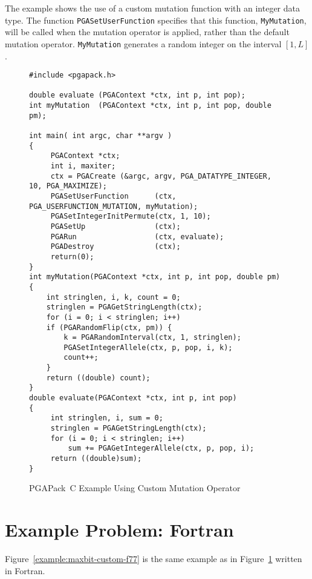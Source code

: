 \documentclass{report}
\newcommand{\pga}{PGAPack}
\begin{document}
The example shows the use of a custom mutation function with an integer data
type.  The function {\tt PGASetUserFunction} specifies that this function,
{\tt MyMutation}, will be called when the mutation operator is applied, rather
than the default mutation operator.  {\tt MyMutation} generates a random
integer on the interval $[1,L]$.

\begin{figure}
\begin{verbatim}
#include <pgapack.h>

double evaluate (PGAContext *ctx, int p, int pop);
int myMutation  (PGAContext *ctx, int p, int pop, double pm);

int main( int argc, char **argv )
{
     PGAContext *ctx; 
     int i, maxiter;
     ctx = PGACreate (&argc, argv, PGA_DATATYPE_INTEGER, 10, PGA_MAXIMIZE);
     PGASetUserFunction      (ctx, PGA_USERFUNCTION_MUTATION, myMutation);
     PGASetIntegerInitPermute(ctx, 1, 10);
     PGASetUp                (ctx);
     PGARun                  (ctx, evaluate);
     PGADestroy              (ctx);
     return(0);
}
int myMutation(PGAContext *ctx, int p, int pop, double pm)
{
    int stringlen, i, k, count = 0;
    stringlen = PGAGetStringLength(ctx);
    for (i = 0; i < stringlen; i++)
    if (PGARandomFlip(ctx, pm)) {
        k = PGARandomInterval(ctx, 1, stringlen);
        PGASetIntegerAllele(ctx, p, pop, i, k);
        count++;
    }
    return ((double) count);
}
double evaluate(PGAContext *ctx, int p, int pop)
{
     int stringlen, i, sum = 0;
     stringlen = PGAGetStringLength(ctx);
     for (i = 0; i < stringlen; i++)
         sum += PGAGetIntegerAllele(ctx, p, pop, i);
     return ((double)sum);
}
\end{verbatim}
\caption{\pga\ C Example Using Custom Mutation Operator}
\label{example:maxbit-custom}
\end{figure}

\section{Example Problem: Fortran}

Figure~\ref{example:maxbit-custom-f77} is the same example as in 
Figure~\ref{example:maxbit-custom} written in Fortran.
\end{document}
